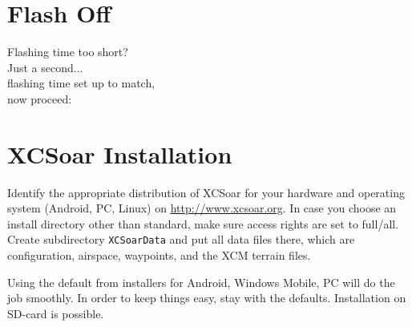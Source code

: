 \documentclass[english,a4paper,12pt]{scrreprt}
\begin{document}
\section*{{\color[rgb]{.9,.85,0}Flash} Off}

\vspace{2em}
\hspace*{1cm} Flashing time too short?\\
\hspace*{4cm} Just a second...\\
\hspace*{6cm} flashing time set up to match,\\
\hspace*{10cm} now proceed:


\setlength{\parskip}{0.3\baselineskip}
\newpage
\section{XCSoar Installation}\label{ch:XCSinstall}


Identify the appropriate distribution of XCSoar for your hardware and 
operating system \textsf{(Android, PC, Linux)} 
on \url{http://www.xcsoar.org}.
In case you choose an install directory other than standard, make sure access 
rights are set to full/all. Create subdirectory \texttt{XCSoarData} and put all 
data files there, which are configuration, airspace, waypoints, and the XCM 
terrain files.

Using the default from installers for Android, Windows Mobile, PC will do the 
job smoothly.  In order to keep things easy, stay with the defaults. 
Installation on SD-card is possible.
\end{document}

